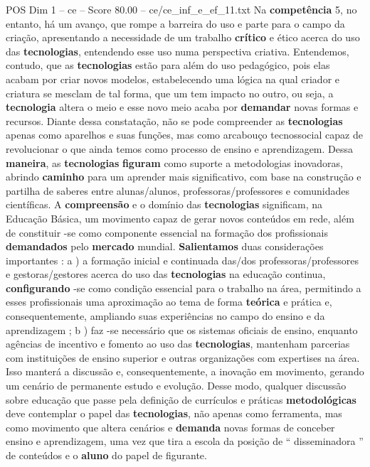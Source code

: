\begin{textsample}{POS Dim 1 – ce – Score 80.00 – ce/ce\_inf\_e\_ef\_11.txt}
Na \textbf{competência} 5, no entanto, há um avanço, que rompe a barreira do uso e parte para o campo da criação, apresentando a necessidade de um trabalho \textbf{crítico} e ético acerca do uso das \textbf{tecnologias}, entendendo esse uso numa perspectiva criativa.
Entendemos, contudo, que as \textbf{tecnologias} estão para além do uso pedagógico, pois elas acabam por criar novos modelos, estabelecendo uma lógica na qual criador e criatura se mesclam de tal forma, que um tem impacto no outro, ou seja, a \textbf{tecnologia} altera o meio e esse novo meio acaba por \textbf{demandar} novas formas e recursos.
Diante dessa constatação, não se pode compreender as \textbf{tecnologias} apenas como aparelhos e suas funções, mas como arcabouço tecnossocial capaz de revolucionar o que ainda temos como processo de ensino e aprendizagem.
Dessa \textbf{maneira}, as \textbf{tecnologias} \textbf{figuram} como suporte a metodologias inovadoras, abrindo \textbf{caminho} para um aprender mais significativo, com base na construção e partilha de saberes entre alunas/alunos, professoras/professores e comunidades científicas.
A \textbf{compreensão} e o domínio das \textbf{tecnologias} significam, na Educação Básica, um movimento capaz de gerar novos conteúdos em rede, além de constituir -se como componente essencial na formação dos profissionais \textbf{demandados} pelo \textbf{mercado} mundial. \textbf{Salientamos} duas considerações importantes : a ) a formação inicial e continuada das/dos professoras/professores e gestoras/gestores acerca do uso das \textbf{tecnologias} na educação continua, \textbf{configurando} -se como condição essencial para o trabalho na área, permitindo a esses profissionais uma aproximação ao tema de forma \textbf{teórica} e prática e, consequentemente, ampliando suas experiências no campo do ensino e da aprendizagem ; b ) faz -se necessário que os sistemas oficiais de ensino, enquanto agências de incentivo e fomento ao uso das \textbf{tecnologias}, mantenham parcerias com instituições de ensino superior e outras organizações com expertises na área.
Isso manterá a discussão e, consequentemente, a inovação em movimento, gerando um cenário de permanente estudo e evolução.
Desse modo, qualquer discussão sobre educação que passe pela definição de currículos e práticas \textbf{metodológicas} deve contemplar o papel das \textbf{tecnologias}, não apenas como ferramenta, mas como movimento que altera cenários e \textbf{demanda} novas formas de conceber ensino e aprendizagem, uma vez que tira a escola da posição de “ disseminadora ” de conteúdos e o \textbf{aluno} do papel de figurante.

\end{textsample}

